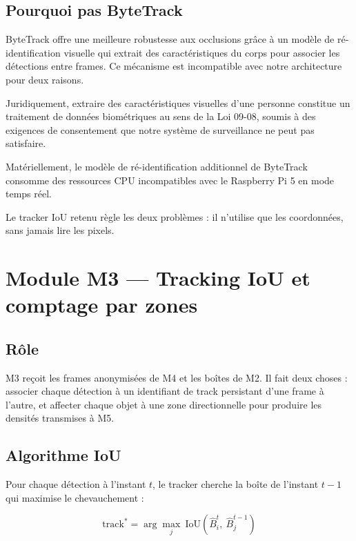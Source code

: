 \subsection{Pourquoi pas ByteTrack}
\label{sec:bytetrack}

ByteTrack offre une meilleure robustesse
aux occlusions grâce à un modèle de
ré-identification visuelle qui extrait
des caractéristiques du corps pour
associer les détections entre frames.
Ce mécanisme est incompatible avec
notre architecture pour deux raisons.

Juridiquement, extraire des
caractéristiques visuelles d'une personne
constitue un traitement de données
biométriques au sens de la Loi 09-08,
soumis à des exigences de consentement
que notre système de surveillance ne
peut pas satisfaire.

Matériellement, le modèle de
ré-identification additionnel de ByteTrack
consomme des ressources CPU incompatibles
avec le Raspberry Pi 5 en mode temps réel.

Le tracker IoU retenu règle les deux
problèmes : il n'utilise que les
coordonnées, sans jamais lire les pixels.

\section{Module M3 — Tracking IoU
         et comptage par zones}

\subsection{Rôle}

M3 reçoit les frames anonymisées de M4
et les boîtes de M2. Il fait deux choses :
associer chaque détection à un identifiant
de track persistant d'une frame à l'autre,
et affecter chaque objet à une zone
directionnelle pour produire les densités
transmises à M5.

\subsection{Algorithme IoU}

Pour chaque détection à l'instant $t$,
le tracker cherche la boîte de l'instant
$t-1$ qui maximise le chevauchement :

\begin{equation}
\text{track}^* =
\arg\max_{j}\ \text{IoU}(
\hat{B}_i^t,\ \hat{B}_j^{t-1})
\label{eq:iou_tracking}
\end{equation}

